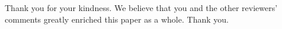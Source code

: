 \documentclass[answers,11pt]{exam}
\begin{document}
\begin{questions}
    \begin{solution}
    Thank you for your kindness. We believe that you and the other reviewers' comments greatly enriched
    this paper as a whole. Thank you.
    \end{solution}






\end{questions}
%
%
\end{document}
